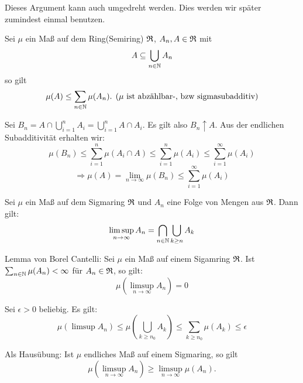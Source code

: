 			\begin{bem}
				Dieses Argument kann auch umgedreht werden. Dies werden wir später zumindest einmal benutzen.
			\end{bem}
			
			\begin{satz}
				Sei $\mu$ ein Maß auf dem Ring(Semiring) $\mathfrak{R}$, $A_n, A\in\mathfrak{R}$ mit
				\[ A\subseteq \bigcup_{n\in\mathbb{N}} A_n \]
				so gilt
				\[ \mu(A)\le \sum_{n\in\mathbb{N}}\mu(A_n).\:\:(\mu\text{ ist abzählbar-, bzw sigmasubadditiv}) \]
			\end{satz}
			
			\begin{bew}
				Sei $B_n=A\cap\bigcup_{i=1}^n A_i=\bigcup_{i=1}^n A\cap A_i$. Es gilt also $B_n\uparrow A$. Aus der endlichen Subadditivität erhalten wir:
				\[ \mu(B_n)\le\sum_{i=1}^n \mu(A_i\cap A)\le \sum_{i=1}^n\mu(A_i)\le \sum_{i=1}^\infty \mu(A_i) \]
				\[ \Rightarrow \mu(A)=\lim_{n\to\infty} \mu(B_n)\le\sum_{i=1}^\infty \mu(A_i) \]
			\end{bew}
			
			\begin{satz}
				Sei $\mu$ ein Maß auf dem Sigmaring $\mathfrak{R}$ und $A_n$ eine Folge von Mengen aus $\mathfrak{R}$. Dann gilt:
				\[ \limsup_{n\to\infty} A_n = \bigcap_{n\in\mathbb{N}}\bigcup_{k\ge n} A_k \]
			\end{satz}
			
			\begin{satz}
				Lemma von Borel Cantelli:\newline
				Sei $\mu$ ein Maß auf einem Sigamring $\mathfrak{R}$. Ist $\sum_{n\in\mathbb{N}} \mu(A_n)<\infty$ für $A_n\in\mathfrak{R}$, so gilt:
				\[ \mu(\limsup_{n\to\infty} A_n)=0 \]
			\end{satz}
			
			\begin{bew}
				Sei $\epsilon>0$ beliebig. Es gilt:
				\[ \mu(\limsup A_n)\le \mu\left(\bigcup_{k\ge n_0} A_k\right)\le \sum_{k\ge n_0} \mu(A_k)\le \epsilon \]
				\arge
			\end{bew}
			
			\begin{bem}
				Als Hausübung: Ist $\mu$ endliches Maß auf einem Sigmaring, so gilt
				\[ \mu(\limsup_{n\to\infty} A_n)\ge \limsup_{n\to\infty} \mu(A_n). \]
			\end{bem}
			
